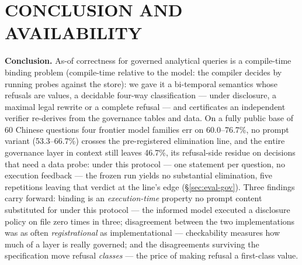 
\section{CONCLUSION AND AVAILABILITY}
\label{sec:concl}

\noindent{}\textbf{Conclusion.} As-of correctness for governed analytical queries
is a compile-time binding problem (compile-time relative to the model: the
compiler decides by running probes against the store): we gave it a
bi-temporal semantics whose refusals are values, a decidable four-way
classification --- under disclosure, a maximal legal rewrite or a complete
refusal --- and certificates an independent verifier re-derives
from the governance tables and data. On a fully public base of 60 Chinese
questions four frontier model families err on 60.0--76.7\%, no prompt variant (53.3--66.7\%)
crosses the pre-registered elimination line, and the entire governance layer in
context still leaves 46.7\%, its refusal-side residue on decisions that need a
data probe: under this protocol --- one statement per question, no execution
feedback --- the frozen run yields no substantial elimination, five
repetitions leaving that verdict at the line's edge
(\S\ref{sec:eval-gov}). Three findings carry forward:
binding is an \emph{execution-time} property no prompt content substituted
for under this protocol --- the informed model executed
a disclosure policy on file zero times in three; disagreement between the two implementations was as often
\emph{registrational} as implementational --- checkability measures how
much of a layer is really governed; and the
disagreements surviving the specification move refusal \emph{classes} ---
the price of making refusal a first-class value.


